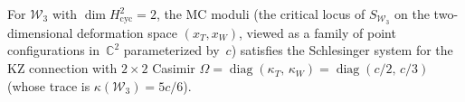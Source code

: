 \begin{conjecture}
\label{conj:nms-rank2-isomonodromic}%
%
\ClaimStatusConjectured
For $\mathcal{W}_3$ with $\dim H^2_{\mathrm{cyc}} = 2$, the MC
moduli (the critical locus of $S_{\mathcal{W}_3}$ on the
two-dimensional deformation space $(x_T, x_W)$, viewed as a family
of point configurations in~$\mathbb{C}^2$ parameterized by~$c$) satisfies
the Schlesinger system for the KZ connection with $2 \times 2$
Casimir $\Omega = \operatorname{diag}(\kappa_T,\, \kappa_W) = \operatorname{diag}(c/2,\, c/3)$
(whose trace is $\kappa(\mathcal{W}_3) = 5c/6$).
\end{conjecture}
